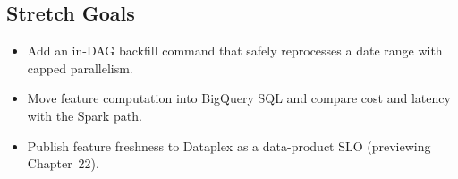 \subsection*{Stretch Goals}
\begin{itemize}
    \item Add an in-DAG backfill command that safely reprocesses a date range with capped parallelism.
    \item Move feature computation into BigQuery SQL and compare cost and latency with the Spark path.
    \item Publish feature freshness to Dataplex as a data-product SLO (previewing Chapter~22).
\end{itemize}
